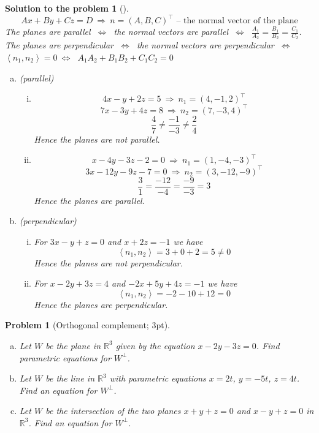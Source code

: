\documentclass[12pt,a4]{article}
\newtheorem{problem}{Problem}
\newtheorem{solution}{Solution to the problem}
\newcommand{\bR}{{\mathbb R}}
\newcommand{\sprod}[2]{\left \langle #1, #2 \right \rangle}
\begin{document}
\begin{solution}[]\rm 
\[
Ax + By + Cz = D
~\Rightarrow~
n = (A,B,C)^\top \text{ -- the normal vector of the plane}
\]
The planes are parallel $~\Leftrightarrow~$ the normal vectors are parallel $~\Leftrightarrow~$ $\frac{A_1}{A_2}=\frac{B_1}{B_2}=\frac{C_1}{C_2}$.\\
The planes are perpendicular $~\Leftrightarrow~$ the normal vectors are perpendicular $~\Leftrightarrow~$ $\sprod{n_1}{n_2} = 0$$~\Leftrightarrow~$ $A_1A_2+B_1B_2+C_1C_2 = 0$
\begin{enumerate}[(a)]
\item (parallel)
\begin{enumerate}[(i)]
\item 
\[
4x - y + 2z = 5
~\Rightarrow~
n_1 = (4, -1, 2)^\top
\]
\[
7x - 3y + 4z = 8
~\Rightarrow~
n_2 = (7, -3, 4)^\top
\]
\[
\frac{4}{7} \neq \frac{-1}{-3} \neq \frac{2}{4}
\]
Hence the planes are not parallel.
\item
\[
x - 4y - 3z - 2 = 0
~\Rightarrow~
n_1 = (1, -4, -3)^\top
\]
\[
3x - 12y - 9z - 7 = 0
~\Rightarrow~
n_2 = (3, -12, -9)^\top
\]
\[
\frac{3}{1} = \frac{-12}{-4} = \frac{-9}{-3} = 3
\]
Hence the planes are parallel.
\end{enumerate}
\item (perpendicular)
\begin{enumerate}[(i)]
\item For $3x - y + z = 0$ and $x + 2z = -1$ we have
\[
\sprod{n_1}{n_2} = 3 + 0 + 2 = 5 \neq 0
\]
Hence the planes are not perpendicular.
\item For $x - 2y + 3z = 4$ and $-2x + 5y + 4z = -1$ we have
\[
\sprod{n_1}{n_2} = -2 - 10 + 12 = 0
\]
Hence the planes are perpendicular.\\
\end{enumerate}
\end{enumerate}
\end{solution}
	
\begin{problem}[Orthogonal complement; 3pt]\rm
	\begin{enumerate}[(a)]
		\item Let $W$ be the plane in $\bR^3$ given by the equation $x-2y-3z=0$. Find parametric equations for $W^\perp$.
		\item Let $W$ be the line in $\bR^3$ with parametric equations $x=2t$, $y=-5t$, $z=4t$. Find an equation for $W^\perp$.
		\item Let $W$ be the intersection of the two planes $x+y+z=0$ and $x-y+z=0$ in $\bR^3$. Find an equation for $W^\perp$.
	\end{enumerate}
\end{problem}
\end{document}
